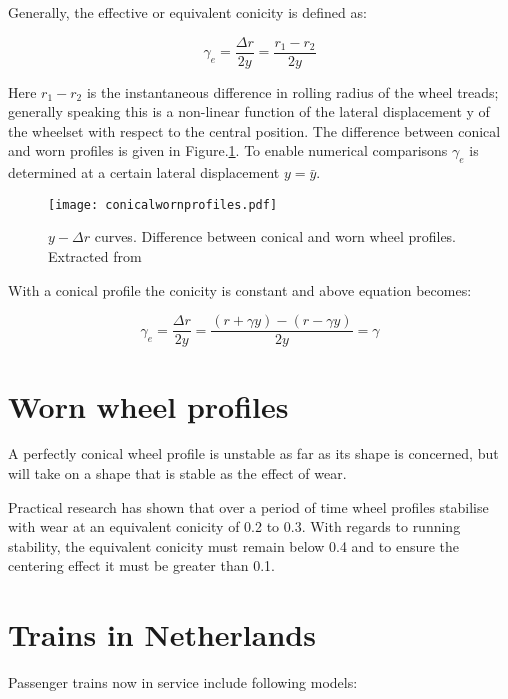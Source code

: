 Generally, the effective or equivalent conicity is defined as:

$$ \gamma_e = \frac{\Delta r}{2y} = \frac{r_1 - r_2}{2y}  $$

Here $r_1 - r_2$ is the instantaneous difference in rolling radius of the wheel treads; generally speaking this is a non-linear function of the lateral displacement y of the wheelset with respect to the central position. The difference between conical and worn profiles is given in Figure.\ref{fig:conicalwornprofiles}. To enable numerical comparisons $\gamma_e$ is determined at a certain lateral displacement $y=\bar{y}$.


\begin{figure}[h]
    \centering
    \texttt{[image: conicalwornprofiles.pdf]}
    \caption{$y-\Delta r$ curves. Difference between conical and worn wheel profiles. Extracted from \cite[2.4]{esveld2001modern}}
    \label{fig:conicalwornprofiles}
\end{figure}

With a conical profile the conicity is constant and above equation becomes:

$$ \gamma_e = \frac{\Delta r}{2y} =\frac{(r+\gamma y)-(r-\gamma y)}{2y} = \gamma $$


\section{Worn wheel profiles}

A perfectly conical wheel profile is unstable as far as its shape is concerned, but will take on a shape that is stable as the effect of wear.

Practical research has shown that over a period of time wheel profiles stabilise with wear at an equivalent conicity of 0.2 to 0.3. With regards to running stability, the equivalent conicity must remain below 0.4 and to ensure the centering effect it must be greater than 0.1.

\section{Trains in Netherlands}

Passenger trains now in service include following models:

